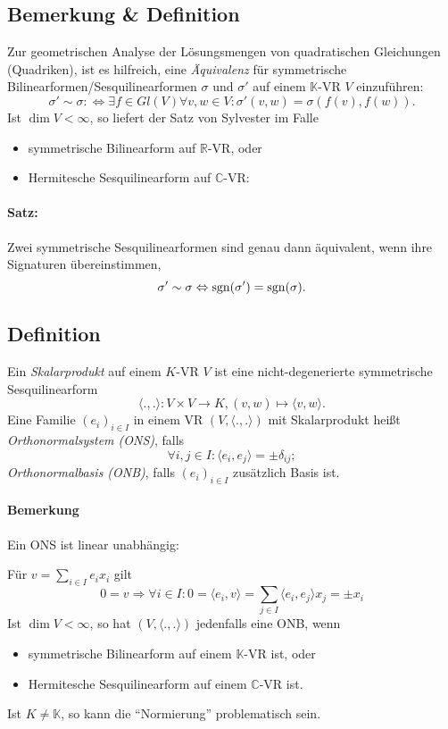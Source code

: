\subsection{Bemerkung \& Definition}
	Zur geometrischen Analyse der Lösungsmengen von quadratischen Gleichungen (Quadriken), ist es hilfreich, eine \emph{Äquivalenz} für symmetrische Bilinearformen/Sesquilinearformen $ \sigma $ und $ \sigma' $ auf einem $ \mathbb{K} $-VR $ V $ einzuführen:
		\[ \sigma' \sim \sigma :\Leftrightarrow \exists f\in Gl(V)\forall v,w\in V: \sigma'(v,w) = \sigma(f(v),f(w)). \]
	Ist $ \dim V <\infty $, so liefert der Satz von Sylvester im Falle
		\begin{itemize}
			\item symmetrische Bilinearform auf $ \mathbb{R} $-VR, oder
			\item Hermitesche Sesquilinearform auf $ \mathbb{C} $-VR:
		\end{itemize}
\paragraph{Satz:}
	Zwei symmetrische Sesquilinearformen sind genau dann äquivalent, wenn ihre Signaturen übereinstimmen,
		\[ \sigma' \sim \sigma \Leftrightarrow  \operatorname{sgn}(\sigma') = \operatorname{sgn}(\sigma). \]
		
\subsection{Definition}
	Ein \emph{Skalarprodukt} auf einem $ K $-VR $ V $ ist eine nicht-degenerierte symmetrische Sesquilinearform
		\[ \langle.,.\rangle:V\times V \to K, (v,w)\mapsto \langle v,w\rangle. \]
	Eine Familie $ (e_i)_{i\in I} $ in einem VR $ (V,\langle.,.\rangle) $ mit Skalarprodukt heißt \emph{Orthonormalsystem (ONS)}, falls
		\[ \forall i,j\in I: \langle e_i,e_j\rangle = \pm \delta_{ij}; \]
	\emph{Orthonormalbasis (ONB)}, falls $ (e_i)_{i\in I} $ zusätzlich Basis ist.
\paragraph{Bemerkung}
	Ein ONS ist linear unabhängig:

	Für $ v=\sum_{i\in I}e_ix_i $ gilt
		\[ 0 = v \Rightarrow \forall i\in I: 0 = \langle e_i,v\rangle = \sum_{j\in I}\langle e_i,e_j\rangle x_j = \pm x_i \]
	Ist $ \dim V < \infty $, so hat $ (V,\langle.,.\rangle) $ jedenfalls eine ONB, wenn
		\begin{itemize}
			\item symmetrische Bilinearform auf einem $ \mathbb{K} $-VR ist, oder
			\item Hermitesche Sesquilinearform auf einem $ \mathbb{C} $-VR ist.
		\end{itemize}
	Ist $ K\neq \mathbb{K} $, so kann die "`Normierung"' problematisch sein.
